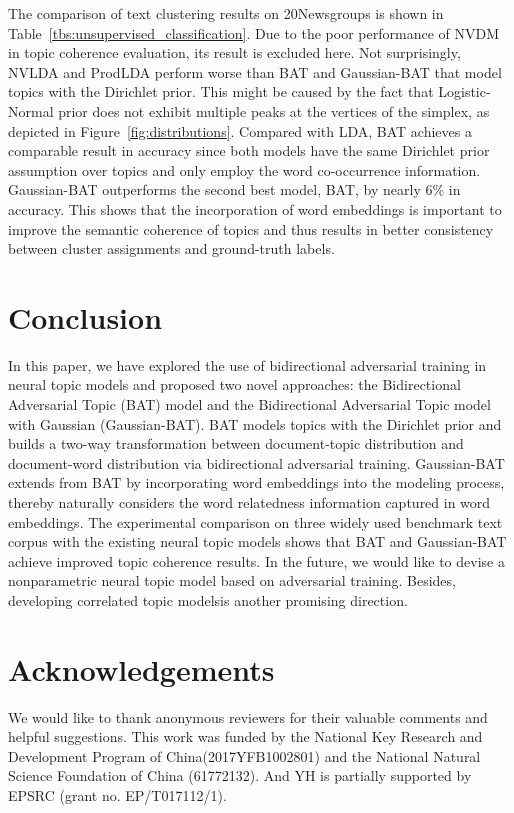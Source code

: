 \documentclass[11pt,a4paper]{article}
\begin{document}
The comparison of text clustering results on 20Newsgroups is shown in Table~\ref{tbs:unsupervised_classification}. Due to the poor performance of NVDM in topic coherence evaluation, its result is excluded here. {\color{black}Not surprisingly, NVLDA and ProdLDA perform worse than BAT and Gaussian-BAT that model topics with the Dirichlet prior. This might be caused by the fact that Logistic-Normal prior does not exhibit multiple peaks at the vertices of the simplex, as depicted in Figure~\ref{fig:distributions}. Compared with LDA, BAT achieves a comparable result in accuracy since both models have the same Dirichlet prior assumption over topics and only employ the word co-occurrence information.  Gaussian-BAT outperforms the second best model, BAT, by nearly 6\% in accuracy. This shows that the incorporation of word embeddings is important to improve the semantic coherence of topics and thus results in better consistency between cluster assignments and ground-truth labels. }

\section{Conclusion}
In this paper, we have explored the use of bidirectional adversarial training in neural topic models and proposed two novel approaches: the Bidirectional Adversarial Topic (BAT) model and the Bidirectional Adversarial Topic model with Gaussian (Gaussian-BAT). BAT models topics with the Dirichlet prior and builds a two-way transformation between document-topic distribution and document-word distribution via bidirectional adversarial training. Gaussian-BAT extends from BAT by incorporating word embeddings into the modeling process, thereby naturally considers the word relatedness information captured in word embeddings. The experimental comparison on three widely used benchmark text corpus with the existing neural topic models shows that BAT and Gaussian-BAT achieve improved topic coherence results. {\color{black}In the future, we would like to devise a nonparametric neural topic model based on adversarial training. Besides, developing correlated topic modelsis another promising direction.}


\section*{Acknowledgements}

We would like to thank anonymous reviewers for their valuable comments and helpful suggestions. This work was funded by the National Key Research and Development Program of China(2017YFB1002801) and the National Natural Science Foundation of China (61772132). And YH is partially supported by EPSRC (grant no. EP/T017112/1).



\end{document}
